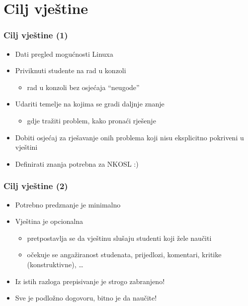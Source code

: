 \documentclass{beamer}
\begin{document}
\section{Cilj vještine}
\begin{frame}[t]
\frametitle{Cilj vještine (1)}
\begin{itemize}
	\item Dati pregled mogućnosti Linuxa
	\item Priviknuti studente na rad u konzoli
	\begin{itemize}
		\item rad u konzoli bez osjećaja “neugode”
	\end{itemize}
	\item Udariti temelje na kojima se gradi daljnje znanje
	\begin{itemize}
		\item gdje tražiti problem, kako pronaći rješenje
	\end{itemize}
	\item Dobiti osjećaj za rješavanje onih problema koji nisu eksplicitno pokriveni u vještini
	\item Definirati znanja potrebna za NKOSL :)
\end{itemize}
\end{frame}

\begin{frame}[t]
\frametitle{Cilj vještine (2)}
\begin{itemize}
	\item Potrebno predznanje je minimalno
	\item Vještina je opcionalna
	\begin{itemize}
		\item pretpostavlja se da vještinu slušaju studenti koji žele naučiti
		\item očekuje se angažiranost studenata, prijedlozi, komentari, kritike (konstruktivne), \ldots
	\end{itemize}
	\item Iz istih razloga prepisivanje je strogo zabranjeno!
	\item Sve je podložno dogovoru, bitno je da naučite!
\end{itemize}
\end{frame}
\end{document}
